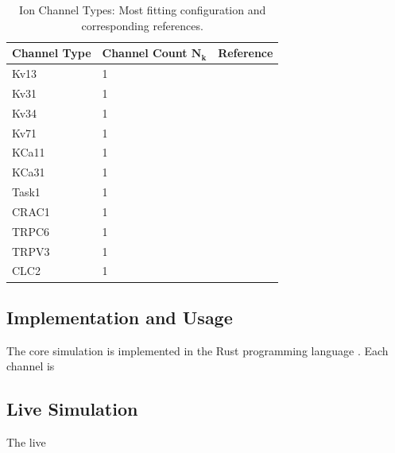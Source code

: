 \documentclass[USenglish,twocolumn]{article}
\begin{document}
  \begin{table}
    \caption{Ion Channel Types: Most fitting configuration and corresponding references.}
    \begin{tabular}{lll}
      \textbf{Channel Type} & \textbf{Channel Count $\bm{N_k}$} & \textbf{Reference}            \\
      \midrule
      Kv13                  & 1                                 & \cite{1998-potassium-channel} \\
      Kv31                  & 1                                 & \cite{1998-potassium-channel} \\
      Kv34                  & 1                                 & \cite{1998-potassium-channel} \\
      Kv71                  & 1                                 & \cite{1998-potassium-channel} \\
      KCa11                 & 1                                 & \cite{1998-potassium-channel} \\
      KCa31                 & 1                                 & \cite{1998-potassium-channel} \\
      Task1                 & 1                                 & \cite{1998-potassium-channel} \\
      CRAC1                 & 1                                 & \cite{1998-potassium-channel} \\
      TRPC6                 & 1                                 & \cite{1998-potassium-channel} \\
      TRPV3                 & 1                                 & \cite{1998-potassium-channel} \\
      CLC2                  & 1                                 & \cite{1998-potassium-channel} \\
    \end{tabular}
    \label{table:channel-types}
  \end{table}

  \subsection{Implementation and Usage}
  The core simulation is implemented in the Rust programming language \cite{2014-rust}.
  Each channel is

  \subsection{Live Simulation}
  The live
\end{document}
